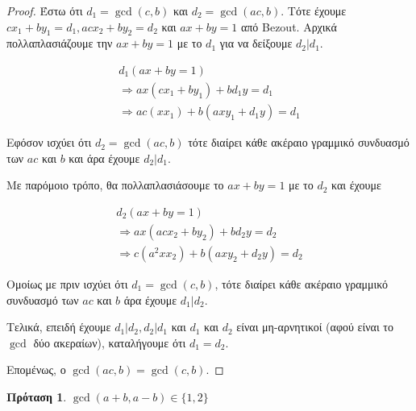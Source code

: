 \documentclass[oneside]{article}
\newtheorem*{lemma}{Πρόταση}
\begin{document}
\begin{proof}
    Έστω ότι  $d_1 = \gcd(c,b)$ και $d_2 = \gcd(ac,b)$.
    Τότε έχουμε $cx_1 + by_1 = d_1, acx_2 + by_2 = d_2$ και $ax + by = 1$ από Bezout.
    Αρχικά πολλαπλασιάζουμε την $ax+by = 1$ με το $d_1$ για να δείξουμε $d_2 | d_1$.
    
    \begin{equation}
        \begin{split}
            d_1(ax + by = 1)  \\
            \Rightarrow ax(cx_1 + by_1) + bd_1y = d_1  \\
            \Rightarrow ac(xx_1) + b(axy_1 + d_1y)  = d_1 
        \end{split}
    \end{equation}
    
    Εφόσον ισχύει ότι $d_2 = \gcd(ac, b)$ τότε διαίρει κάθε ακέραιο γραμμικό συνδυασμό των $ac$ και $b$ και άρα έχουμε $d_2|d_1$. 

    Με παρόμοιο τρόπο, θα πολλαπλασιάσουμε το $ax + by = 1$ με το $d_2$ και έχουμε

    \begin{equation}
        \begin{split}
            d_2(ax + by = 1) \\
            \Rightarrow ax(acx_2 + by_2) + bd_2y = d_2 \\
            \Rightarrow c(a^2xx_2) + b(axy_2 + d_2y) = d_2
        \end{split}
    \end{equation}

    Ομοίως με πριν ισχύει ότι $d_1 = \gcd(c,b)$, τότε διαίρει κάθε ακέραιο γραμμικό συνδυασμό των $ac$ και $b$ άρα έχουμε $d_1|d_2$.

    Τελικά, επειδή έχουμε $d_1|d_2, d_2|d_1$ και $d_1$ και $d_2$ είναι μη-αρνητικοί (αφού είναι το $\gcd$ δύο ακεραίων), καταλήγουμε ότι $d_1 = d_2$.
    
    Επομένως, ο $\gcd(ac,b) = \gcd(c,b)$.
\end{proof}

\begin{lemma}
    $\gcd(a+b, a-b) \in \{1,2\}$
\end{lemma}
\end{document}
